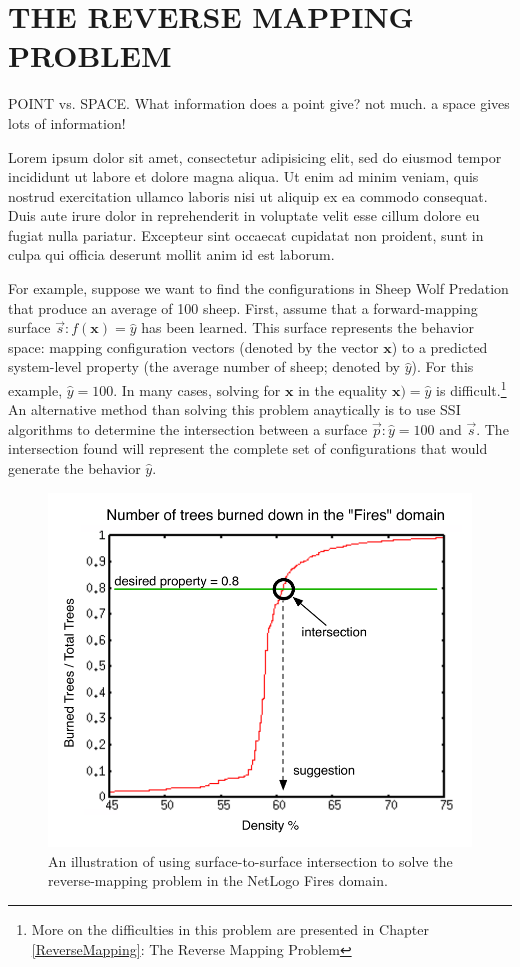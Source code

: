 \chapter{THE REVERSE MAPPING PROBLEM}
\thispagestyle{plain}

\label{ReverseMapping}

POINT vs. SPACE. What information does a point give? not much. a space gives lots of information!


Lorem ipsum dolor sit amet, consectetur adipisicing elit, sed do eiusmod tempor incididunt ut labore et dolore magna aliqua. Ut enim ad minim veniam, quis nostrud exercitation ullamco laboris nisi ut aliquip ex ea commodo consequat. Duis aute irure dolor in reprehenderit in voluptate velit esse cillum dolore eu fugiat nulla pariatur. Excepteur sint occaecat cupidatat non proident, sunt in culpa qui officia deserunt mollit anim id est laborum.

For example, suppose we want to find the configurations in Sheep Wolf Predation that produce an average of 100 sheep.
First, assume that a forward-mapping surface $\vec{s} : f(\mathbf x) = \hat y$ has been learned.
This surface represents the behavior space: mapping configuration vectors (denoted by the vector $\mathbf x$) to a predicted system-level property (the average number of sheep; denoted by $\hat y$).
For this example, $\hat y = 100$.
In many cases, solving for $\mathbf x$ in the equality $\mathbf x) = \hat y$ is difficult.\footnote{More on the difficulties in this problem are presented in Chapter \ref{ReverseMapping}: The Reverse Mapping Problem}
An alternative method than solving this problem anaytically is to use SSI algorithms to determine the intersection between a surface $\vec{p} : \hat y = 100$  and $\vec{s}$.
The intersection found will represent the complete set of configurations that would generate the behavior $\hat y$.

\begin{figure}[ht]
\centering
\includegraphics[scale=.66667]{images/firespace-intersection.pdf}
\caption{An illustration of using surface-to-surface intersection to solve the reverse-mapping problem in the NetLogo Fires domain.}
\label{fig:fires-inter}
\end{figure}

